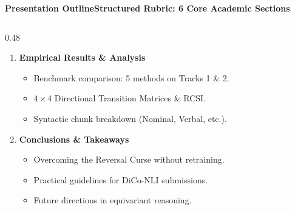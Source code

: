 \documentclass[aspectratio=169,10pt]{beamer}
\begin{document}
\begin{frame}{\textbf{Presentation Outline}}{\textbf{Structured Rubric: 6 Core Academic Sections}}
\begin{columns}[T]
\begin{column}{0.48\textwidth}
\begin{enumerate}
        \item \textbf{\color{UNAMNavy}Empirical Results \& Analysis}
          \begin{itemize}\footnotesize\setlength{\itemsep}{1pt}
            \item Benchmark comparison: 5 methods on Tracks 1 \& 2.
            \item $4 \times 4$ Directional Transition Matrices \& RCSI.
            \item Syntactic chunk breakdown (Nominal, Verbal, etc.).
          \end{itemize}

        \item \textbf{\color{UNAMNavy}Conclusions \& Takeaways}
          \begin{itemize}\footnotesize\setlength{\itemsep}{1pt}
            \item Overcoming the Reversal Curse without retraining.
            \item Practical guidelines for DiCo-NLI submissions.
            \item Future directions in equivariant reasoning.
          \end{itemize}
      \end{enumerate}
    \end{column}
  \end{columns}
\end{frame}
\end{document}
